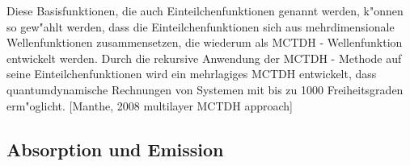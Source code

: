 Diese Basisfunktionen, die auch Einteilchenfunktionen genannt werden, k"onnen so gew"ahlt werden, dass die Einteilchenfunktionen sich aus mehrdimensionale
Wellenfunktionen zusammensetzen, die wiederum als MCTDH - Wellenfunktion entwickelt werden.
Durch die rekursive Anwendung der MCTDH - Methode auf seine Einteilchenfunktionen wird ein mehrlagiges MCTDH entwickelt, dass quantumdynamische Rechnungen
von Systemen mit bis zu 1000 Freiheitsgraden erm"oglicht. [Manthe, 2008 multilayer MCTDH approach]



 \subsection{Absorption und Emission}
